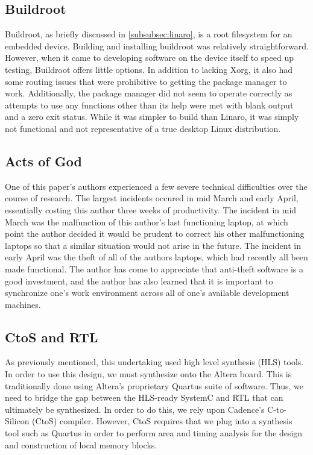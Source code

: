 \documentclass{sig-alternate-10pt}
\begin{document}
\subsection{Buildroot}
Buildroot, as briefly discussed in \ref{subsubsec:linaro}, is a root filesystem for an embedded device. Building and installing buildroot was relatively straightforward. However, when it came to developing software on the device itself to speed up testing, Buildroot offers little options. In addition to lacking Xorg, it also had some routing issues that were prohibitive to getting the package manager to work. Additionally, the package manager did not seem to operate correctly as attempts to use any functions other than its help were met with blank output and a zero exit status. While it was simpler to build than Linaro, it was simply not functional and not representative of a true desktop Linux distribution.

\subsection{Acts of God}
One of this paper's authors experienced a few severe technical difficulties over the course of research. The largest incidents occured in mid March and early April, essentially costing this author three weeks of productivity. The incident in mid March was the malfunction of this author's last functioning laptop, at which point the author decided it would be prudent to correct his other malfunctioning laptops so that a similar situation would not arise in the future. The incident in early April was the theft of all of the authors laptops, which had recently all been made functional. The author has come to appreciate that anti-theft software is a good investment, and the author has also learned that it is important to synchronize one's work environment across all of one's available development machines.

\subsection{CtoS and RTL}
As previously mentioned, this undertaking used high level synthesis (HLS)
tools.  In order to use this design, we must synthesize onto the Altera
board.  This is traditionally done using Altera's proprietary Quartus suite
of software.  Thus, we need to bridge the gap between the HLS-ready SystemC
and RTL that can ultimately be synthesized.  In order to do this, we rely
upon Cadence's C-to-Silicon (CtoS) compiler.  However, CtoS requires that we
plug into a synthesis tool such as Quartus in order to perform area and
timing analysis for the design and construction of local memory blocks.
\end{document}
